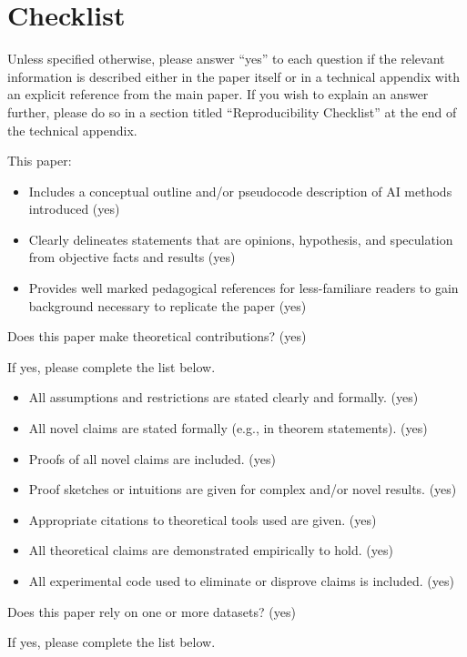\clearpage
\section*{Checklist}
Unless specified otherwise, please answer “yes” to each question if the relevant information is described either in the paper itself or in a technical appendix with an explicit reference from the main paper. If you wish to explain an answer further, please do so in a section titled “Reproducibility Checklist” at the end of the technical appendix.

This paper:
\begin{itemize}
\item Includes a conceptual outline and/or pseudocode description of AI methods introduced (yes)
\item Clearly delineates statements that are opinions, hypothesis, and speculation from objective facts and results (yes)
\item Provides well marked pedagogical references for less-familiare readers to gain background necessary to replicate the paper (yes)
\end{itemize}

Does this paper make theoretical contributions? (yes) 

If yes, please complete the list below.

\begin{itemize}
\item All assumptions and restrictions are stated clearly and formally. (yes)
\item All novel claims are stated formally (e.g., in theorem statements). (yes)
\item Proofs of all novel claims are included. (yes)
\item Proof sketches or intuitions are given for complex and/or novel results. (yes)
\item Appropriate citations to theoretical tools used are given. (yes)
\item All theoretical claims are demonstrated empirically to hold. (yes)
\item All experimental code used to eliminate or disprove claims is included. (yes)
\end{itemize}

Does this paper rely on one or more datasets? (yes)

If yes, please complete the list below.

